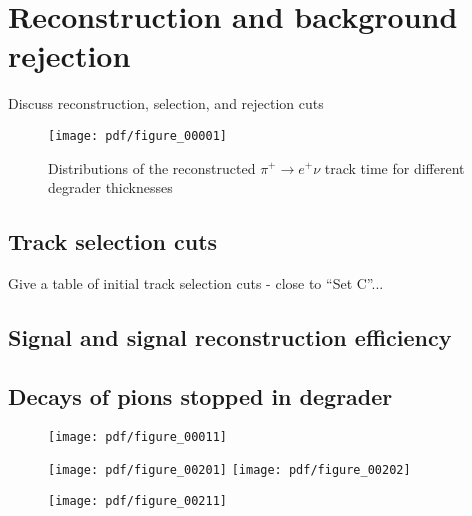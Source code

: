 \section {Reconstruction and background rejection}

Discuss reconstruction, selection, and rejection cuts

\begin{figure}
  \centering
  \texttt{[image: pdf/figure\_00001]}
  \caption{
    \label{fig:pions_timing}
    Distributions of the reconstructed $\pi^+ \to e^+ \nu$ track time for different degrader thicknesses
  }
\end{figure}



\subsection{Track selection cuts}

Give a table of initial track selection cuts - close to ``Set C''...


\subsection{Signal and signal reconstruction efficiency}


\subsection{Decays of pions stopped in degrader}

\begin{figure}[H]
  \texttt{[image: pdf/figure\_00011]}
  \caption{
  }
\end{figure}

\begin{figure}[H]
  \texttt{[image: pdf/figure\_00201]}
  \texttt{[image: pdf/figure\_00202]}
  \caption{
  }
\end{figure}

\begin{figure}[H]
  \texttt{[image: pdf/figure\_00211]}
  \caption{
  }
\end{figure}


